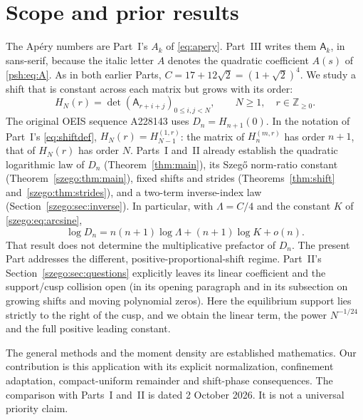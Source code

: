 \documentclass[11pt,a4paper]{article}
\numberwithin{equation}{section}
\theoremstyle{remark}\newtheorem{remark}[theorem]{Remark}
\newcommand{\A}{\mathsf A}
\begin{document}
\section{Scope and prior results}
\label{psh:sec:scope}
The Ap\'ery numbers are Part~I's $A_k$ of \eqref{eq:apery}. Part~III writes
them $\A_k$, in sans-serif, because the italic letter $A$ denotes the
quadratic coefficient $A(s)$ of \eqref{psh:eq:A}. As in both earlier Parts,
$C=17+12\sqrt2=(1+\sqrt2)^4$.
We study a shift that is constant across each matrix but grows with its
order:
\begin{equation}\label{psh:eq:det}
 H_N(r)=\det(\A_{r+i+j})_{0\leq i,j<N},
 \qquad N\geq1,\quad r\in\mathbb Z_{\geq0}.
\end{equation}
The original OEIS sequence A228143 uses $D_n=H_{n+1}(0)$. In the notation
of Part~I's \eqref{eq:shiftdef}, $H_N(r)=H_{N-1}^{(1,r)}$: the matrix of
$H^{(m,r)}_n$ has order $n+1$, that of $H_N(r)$ has order $N$.
Parts~I and~II already establish the quadratic logarithmic law of $D_n$
(Theorem~\ref{thm:main}), its Szeg\H{o} norm-ratio constant
(Theorem~\ref{szego:thm:main}), fixed shifts and strides
(Theorems~\ref{thm:shift} and~\ref{szego:thm:strides}), and a two-term
inverse-index law (Section~\ref{szego:sec:inverse}). In particular, with
$\Lambda=C/4$ and the constant $K$ of \eqref{szego:eq:arcsine},
\[
 \log D_n=n(n+1)\log\Lambda+(n+1)\log K+o(n).
\]
That result does not determine the multiplicative prefactor of $D_n$.
The present Part addresses the different, positive-proportional-shift
regime. Part~II's Section~\ref{szego:sec:questions} explicitly leaves its
linear coefficient and the support/cusp collision open (in its opening
paragraph and in its subsection on growing shifts and moving polynomial
zeros). Here the equilibrium support lies strictly to the right of the
cusp, and we obtain the linear term, the power $N^{-1/24}$ and the full
positive leading constant.

The general methods and the moment density are established mathematics.
Our contribution is this application with its explicit normalization,
confinement adaptation, compact-uniform remainder and shift-phase
consequences. The comparison with Parts~I and~II is dated
2 October 2026. It is not a universal priority claim.
\end{document}
